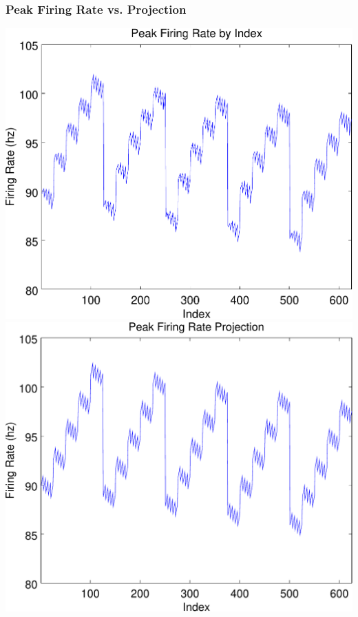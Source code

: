 \documentclass{beamer}
\theoremstyle{plain}
\theoremstyle{definition}
\begin{document}
\begin{frame}\frametitle{Peak Firing Rate vs. Projection}
  \begin{center}
    \includegraphics[scale=.32]{PeakFiringRate.pdf}%
    \includegraphics[scale=.32]{PeakFiringRateProjection.pdf}
  \end{center}
\end{frame}

\end{document}

